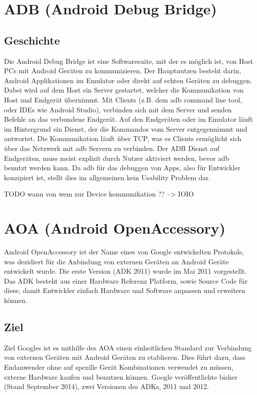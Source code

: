 \documentclass[12pt,journal,compsoc]{IEEEtran}
\begin{document}
\section{ADB (Android Debug Bridge)}
\subsection{Geschichte}
Die Android Debug Bridge ist eine Softwaresuite, mit der es möglich ist, von Host PCs mit Android Geräten zu kommunizieren.
Der Hauptnutzen besteht darin, Android Applikationen im Emulator oder direkt auf echten Geräten zu debuggen.
Dabei wird auf dem Host ein Server gestartet, welcher die Kommunikation von Host und Endgerät übernimmt. 
Mit Clients (z.B. dem adb command line tool, oder IDEs wie Android Studio), verbinden sich mit dem Server und senden Befehle an das verbundene Endgerät.
Auf den Endgeräten oder im Emulator läuft im Hintergrund ein Dienst, der die Kommandos vom Server entgegennimmt und antwortet. Die Kommunikation läuft über TCP,
was es Clients ermöglicht sich über das Netzwerk mit adb Servern zu verbinden.
Der ADB Dienst auf Endgeräten, muss meist explizit durch Nutzer aktiviert werden, bevor adb benutzt werden kann. Da adb für das debuggen von Apps, also für Entwickler konzipiert ist, stellt dies im allgemeinen kein Usability Problem dar.


TODO wann von wem zur Device kommunikation ?? --> IOIO


\section{AOA (Android OpenAccessory)}
Android OpenAccessory ist der Name eines von Google entwickelten Protokols, was 
dezidiert für die Anbindung von externen Geräten an Android Geräte entwickelt wurde.
Die erste Version (ADK 2011) wurde im Mai 2011 vorgestellt.
Das ADK besteht aus einer Hardware Referenz Platform, sowie Source Code für diese, damit 
Entwickler einfach Hardware und Software anpassen und erweitern können.
\cite{developaoa}
\subsection{Ziel}
Ziel Googles ist es mithilfe des AOA einen einheitlichen Standard zur Verbindung von externen Geräten mit Android Geräten zu etablieren.
Dies führt dazu, dass Endanwender ohne auf spezille Gerät Kombinationen verwendet zu müssen, externe Hardware kaufen und benutzen können.
Google veröffentlichte bisher (Stand September 2014), zwei Versionen des ADKs, 2011 und 2012. 
\end{document}
